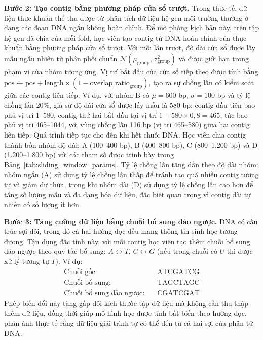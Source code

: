 \textbf{Bước 2: Tạo contig bằng phương pháp cửa sổ trượt.} Trong thực tế, dữ liệu thực khuẩn thể thu được từ phân tích dữ liệu hệ gen môi trường thường ở dạng các đoạn DNA ngắn không hoàn chỉnh. Để mô phỏng kịch bản này, trên tập hệ gen đã chia của mỗi fold, học viên tạo contig từ DNA hoàn chỉnh của thực khuẩn bằng phương pháp cửa sổ trượt. Với mỗi lần trượt, độ dài cửa sổ được lấy mẫu ngẫu nhiên từ phân phối chuẩn $\mathcal{N}(\mu_{\text{group}}, \sigma_{\text{group}}^2)$ và được giới hạn trong phạm vi của nhóm tương ứng. Vị trí bắt đầu của cửa sổ tiếp theo được tính bằng $\text{pos} \leftarrow \text{pos} + \text{length} \times (1 - \text{overlap\_ratio}_{\text{group}})$, tạo ra sự chồng lấn có kiểm soát giữa các contig liên tiếp. Ví dụ, với nhóm B có $\mu = 600$ bp, $\sigma = 100$ bp và tỷ lệ chồng lấn 20\%, giả sử độ dài cửa sổ được lấy mẫu là 580 bp: contig đầu tiên bao phủ vị trí 1--580, contig thứ hai bắt đầu tại vị trí $1 + 580 \times 0{,}8 = 465$, tức bao phủ vị trí 465--1044, với vùng chồng lấn 116 bp (vị trí 465--580) giữa hai contig liên tiếp. Quá trình tiếp tục cho đến khi hết chuỗi DNA. Học viên chia contig thành bốn nhóm độ dài: A (100--400 bp), B (400--800 bp), C (800--1.200 bp) và D (1.200--1.800 bp) với các tham số được trình bày trong Bảng~\ref{tab:sliding_window_params}. Tỷ lệ chồng lấn tăng dần theo độ dài nhóm: nhóm ngắn (A) sử dụng tỷ lệ chồng lấn thấp để tránh tạo quá nhiều contig tương tự và giảm dư thừa, trong khi nhóm dài (D) sử dụng tỷ lệ chồng lấn cao hơn để tăng số lượng mẫu và đa dạng hóa dữ liệu, đặc biệt quan trọng vì contig dài tự nhiên có số lượng ít hơn.

\textbf{Bước 3: Tăng cường dữ liệu bằng chuỗi bổ sung đảo ngược.} DNA có cấu trúc sợi đôi, trong đó cả hai hướng đọc đều mang thông tin sinh học tương đương. Tận dụng đặc tính này, với mỗi contig học viên tạo thêm chuỗi bổ sung đảo ngược theo quy tắc bổ sung: $A \leftrightarrow T$, $C \leftrightarrow G$ (nếu trong chuỗi có $U$ thì được xử lý tương tự $T$). Ví dụ:
\begin{align*}
    \text{Chuỗi gốc:}          & \quad \text{ATCGATCG} \\
    \text{Chuỗi bổ sung:}      & \quad \text{TAGCTAGC} \\
    \text{Chuỗi bổ sung đảo ngược:}  & \quad \text{CGATCGAT}
\end{align*}
Phép biến đổi này tăng gấp đôi kích thước tập dữ liệu mà không cần thu thập thêm dữ liệu, đồng thời giúp mô hình học được tính bất biến theo hướng đọc, phản ánh thực tế rằng dữ liệu giải trình tự có thể đến từ cả hai sợi của phân tử DNA.

